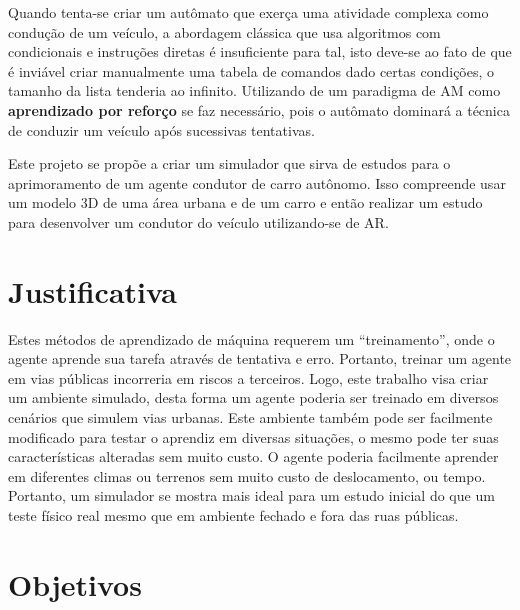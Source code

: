 Quando tenta-se criar um autômato que exerça uma atividade complexa como condução de um veículo, a abordagem clássica que usa algoritmos com condicionais e instruções diretas é insuficiente para tal, isto deve-se ao fato de que é inviável criar manualmente uma tabela de comandos dado certas condições, o tamanho da lista tenderia ao infinito. Utilizando de um paradigma de AM como \textbf{aprendizado por reforço} se faz necessário, pois o autômato dominará a técnica de conduzir um veículo após sucessivas tentativas.

Este projeto se propõe a criar um simulador que sirva de estudos para o aprimoramento de um agente condutor de carro autônomo. Isso compreende usar um modelo 3D de uma área urbana e de um carro e então realizar um estudo para desenvolver um condutor do veículo utilizando-se de AR.



\section*{Justificativa}\label{sec:justificativa}
Estes métodos de aprendizado de máquina requerem um ``treinamento'', onde o agente aprende sua tarefa através de tentativa e erro. Portanto, treinar um agente em vias públicas incorreria em riscos a terceiros. Logo, este trabalho visa criar um ambiente simulado, desta forma um agente poderia ser treinado em diversos cenários que simulem vias urbanas. Este ambiente também pode ser facilmente modificado para testar o aprendiz em diversas situações, o mesmo pode ter suas características alteradas sem muito custo. O agente poderia facilmente aprender em diferentes climas ou terrenos sem muito custo de deslocamento, ou tempo. Portanto, um simulador se mostra mais ideal para um estudo inicial do que um teste físico real mesmo que em ambiente fechado e fora das ruas públicas.

\section*{Objetivos}\label{sec:objetivos}
